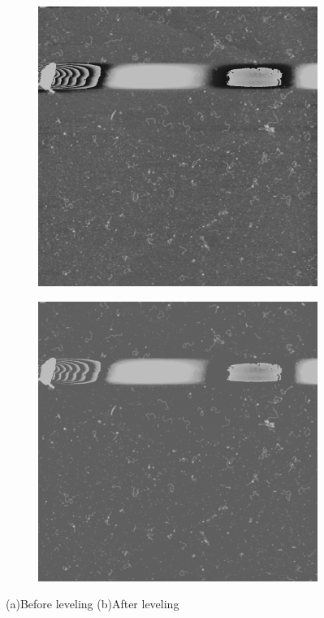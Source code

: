 \documentclass{article}
\begin{document}
\begin{figure}[!htbp]
	\begin{subfigure}{0.5\textwidth}
		\includegraphics[width=\linewidth]{noise21.png}
		\caption{}
		\label{fig:rawImage}
	\end{subfigure}%
	\hspace{\fill}
	\begin{subfigure}{0.5\textwidth}
		\includegraphics[width=\linewidth]{step21.png}
		\caption{}
		\label{fig:step1}
	\end{subfigure}%
	\caption{(a)Before leveling (b)After leveling }\label{fig:background}
\end{figure}
\end{document}
